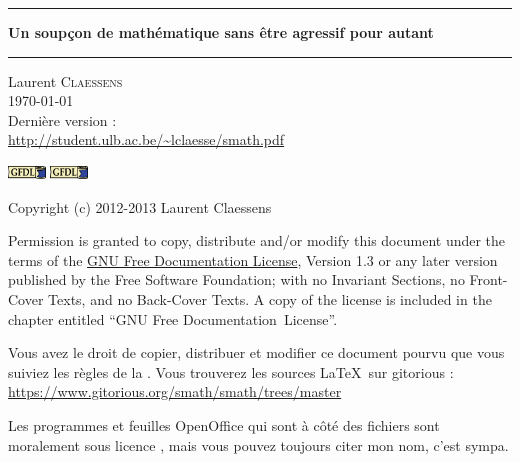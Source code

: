 
\thispagestyle{empty}

\begin{center}
  \begin{minipage}{15cm}
    \hrule\par
    \vspace{2mm}
    \begin{center}
    \Huge \bfseries Un soupçon de mathématique sans être agressif pour autant \par
    \end{center}
    \hrule\par
  \end{minipage}
\end{center}

\vspace{2cm}

\begin{center}
    Laurent \textsc{Claessens}\\
    \today\\
    Dernière version :\\
    \url{http://student.ulb.ac.be/~lclaesse/smath.pdf}
\end{center}

\vfill

\begin{center}

           \ifpdf
            \includegraphics[width=1cm]{gfdl-logo-small.png}
        \else
            \includegraphics[width=1cm]{gfdl-logo-small.eps}
        \fi

Copyright (c) 2012-2013  Laurent Claessens

Permission is granted to copy, distribute and/or modify this document under the terms of the \href{http://www.gnu.org/licenses/fdl-1.3.html}{GNU Free Documentation License}, Version 1.3 or any later version published by the Free Software Foundation; with no Invariant Sections, no Front-Cover Texts, and no Back-Cover Texts. A copy of the license is included in the chapter entitled ``GNU Free Documentation~License''.

\vspace{0.5cm}

Vous avez le droit de copier, distribuer et modifier ce document pourvu que vous suiviez les règles de la . Vous trouverez les sources \LaTeX\ sur gitorious :\\
    \url{https://www.gitorious.org/smath/smath/trees/master}

    Les programmes et feuilles OpenOffice qui sont à côté des fichiers  sont moralement sous licence , mais vous pouvez toujours citer mon nom, c'est sympa.

\end{center}
